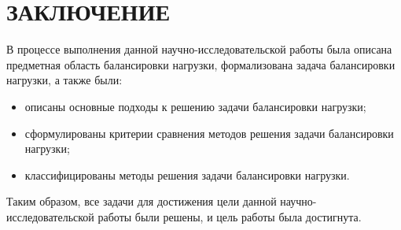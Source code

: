 \chapter*{ЗАКЛЮЧЕНИЕ}




В процессе выполнения данной научно-исследовательской работы была описана предметная область балансировки нагрузки, формализована задача балансировки нагрузки, а также были:
\begin{itemize}
    \item описаны основные подходы к решению задачи балансировки нагрузки;
    \item сформулированы критерии сравнения методов решения задачи балансировки нагрузки;
    \item классифицированы методы решения задачи балансировки нагрузки.
\end{itemize}

Таким образом, все задачи для достижения цели данной научно-исследовательской работы были решены, и цель работы была достигнута.
